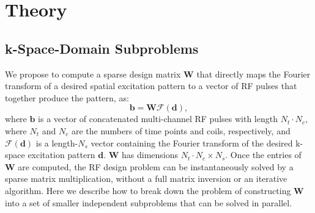 \section*{Theory}

\subsection*{k-Space-Domain Subproblems}
We propose to compute a sparse 
design matrix $\bm{W}$ that directly maps the Fourier transform of a desired spatial 
excitation pattern to a vector of RF pulses that together produce the pattern, as:
\begin{equation}
\bm{b} = \bm{W} \mathcal{F}(\bm{d}),
\end{equation}
where $\bm{b}$ is a vector of concatenated multi-channel RF pulses with length $N_t \cdot N_c$, 
where $N_t$ and $N_c$ are the numbers of time points and coils, respectively,
and $\mathcal{F}(\bm{d})$ is a length-$N_s$ vector containing the 
Fourier transform of the desired k-space excitation pattern $\bm{d}$.
$\bm{W}$ has dimensions $N_t \cdot N_c \times N_s$.
Once the entries of $\bm{W}$ are computed, 
the RF design problem can be instantaneously solved by a sparse matrix multiplication, 
without a full matrix inversion or an iterative algorithm. 
Here we describe how to break down the problem of constructing $\bm{W}$ 
into a set of smaller independent subproblems that can be solved in parallel. 


